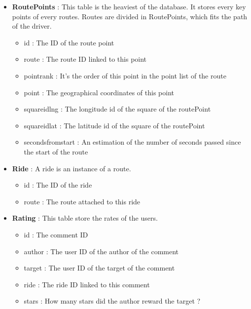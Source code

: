 \begin{itemize}
\begin{itemize}
    	\item route : The route ID linked to this meta
    	\item route\textunderscore date : First date of the repeat. It''s assumed to be every week starting from this day
    	\item weekly\textunderscore repeat : Is this route must be repeated every week ?
    \end{itemize}
    \item \textbf{RoutePoints} : This table is the heaviest of the database. It stores every key points of every routes. Routes are divided in RoutePoints, which fits the path of the driver.
    \begin{itemize}
    	\item id : The ID of the route point
    	\item route : The route ID linked to this point
    	\item point\textunderscore rank : It's the order of this point in the point list of the route
    	\item point : The geographical coordinates of this point
    	\item square\textunderscore id\textunderscore lng : The longitude id of the square of the routePoint
    	\item square\textunderscore id\textunderscore lat : The latitude id of the square of the routePoint
    	\item seconds\textunderscore from\textunderscore start : An estimation of the number of seconds passed since the start of the route
    \end{itemize}
    \item \textbf{Ride} : A ride is an instance of a route.
    \begin{itemize}
    	\item id : The ID of the ride
    	\item route : The route attached to this ride
    \end{itemize}
    \item \textbf{Rating} : This table store the rates of the users.
    \begin{itemize}
    	\item id : The comment ID
    	\item author : The user ID of the author of the comment
    	\item target : The user ID of the target of the comment
    	\item ride : The ride ID linked to this comment
    	\item stars : How many stars did the author reward the target ?

\end{itemize}
\end{itemize}
